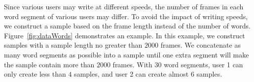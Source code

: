 Since various users may write at different speeds, the number of frames in each word segment of various users may differ. To avoid the impact of writing speeds, we construct a sample based on the frame length instead of the number of words. Figure~\ref{fig:dataWords} demonstrates an example.
In this example, we construct samples with a sample length no greater than $2000$ frames. 
We concatenate as many word segments as possible into a sample until one extra segment will make the sample contain more than $2000$ frames. 
With $30$ word segments, user 1 can only create less than $4$ samples, and user 2 can create almost $6$ samples. %



